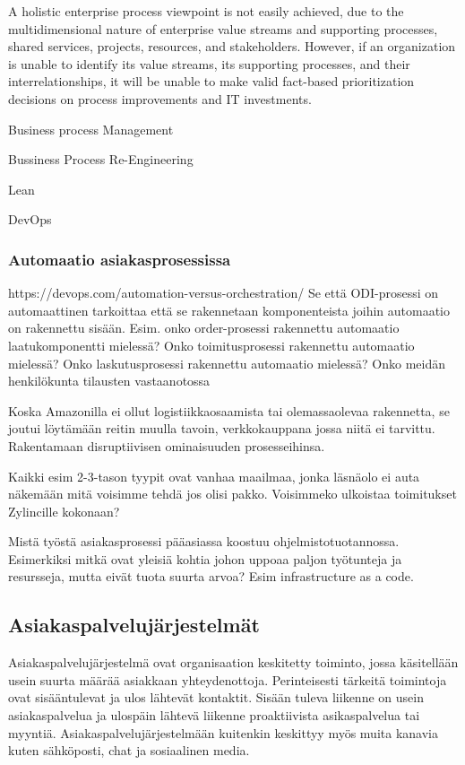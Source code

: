 \documentclass[finnish,12pt,a4paper,pdftex]{article}
\begin{document}
A holistic enterprise process viewpoint is not easily achieved, due to
the multidimensional nature of enterprise value streams and supporting
processes, shared services, projects, resources, and stakeholders.
However, if an organization is unable to identify its value streams, its
supporting processes, and their interrelationships, it will be unable to
make valid fact-based prioritization decisions on process improvements
and IT investments. 

Business process Management

Bussiness Process Re-Engineering

Lean



DevOps
\subsubsection{Automaatio asiakasprosessissa}
https://devops.com/automation-versus-orchestration/ 
Se että ODI-prosessi on automaattinen tarkoittaa että se rakennetaan komponenteista joihin automaatio on rakennettu sisään. Esim. onko order-prosessi rakennettu automaatio laatukomponentti mielessä? Onko toimitusprosessi rakennettu automaatio mielessä? Onko laskutusprosessi rakennettu automaatio mielessä?
Onko meidän henkilökunta tilausten vastaanotossa 

Koska Amazonilla ei ollut logistiikkaosaamista tai olemassaolevaa rakennetta, se joutui löytämään reitin muulla tavoin, verkkokauppana jossa niitä ei tarvittu. Rakentamaan disruptiivisen ominaisuuden prosesseihinsa.

Kaikki esim 2-3-tason tyypit ovat vanhaa maailmaa, jonka läsnäolo ei auta näkemään mitä voisimme tehdä jos olisi pakko. Voisimmeko ulkoistaa toimitukset Zylincille kokonaan?

Mistä työstä asiakasprosessi pääasiassa koostuu ohjelmistotuotannossa. Esimerkiksi mitkä ovat yleisiä kohtia johon uppoaa paljon työtunteja ja resursseja, mutta eivät tuota suurta arvoa? Esim infrastructure as a code.





\subsection{Asiakaspalvelujärjestelmät}

Asiakaspalvelujärjestelmä ovat organisaation keskitetty toiminto, jossa käsitellään usein suurta määrää asiakkaan yhteydenottoja. Perinteisesti tärkeitä toimintoja ovat sisääntulevat ja ulos lähtevät kontaktit. Sisään tuleva liikenne on usein asiakaspalvelua ja ulospäin lähtevä liikenne proaktiivista asikaspalvelua tai myyntiä. Asiakaspalvelujärjestelmään kuitenkin keskittyy myös muita kanavia kuten sähköposti, chat ja sosiaalinen media.
\end{document}
